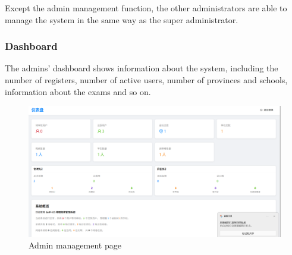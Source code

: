 \documentclass[12pt]{article}
\begin{document}
Except the admin management
function, the other administrators are able to manage the system in the same way as the super administrator.
\subsubsection{Dashboard}
The admins' dashboard shows information about the system, including the number of registers, number of active users, number of provinces and schools,
information about the exams and so on.
\begin{figure}[H]
    \centering
    \includegraphics[width=\textwidth]{admin/dashboard4admin.png}
    \caption{Admin management page}
    \label{fig:adminmanage page}
\end{figure}
\end{document}
